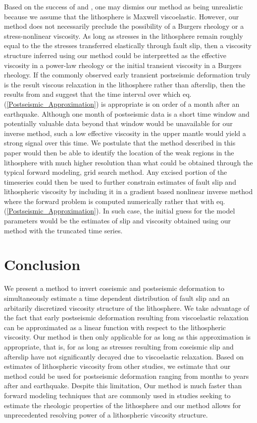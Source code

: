 \documentclass[extra]{gji}
\begin{document}
Based on the success of \citet{P2003,P2005} and \citet{F2006b}, one
may dismiss our method as being unrealistic because we assume that the
lithosphere is Maxwell viscoelastic.  However, our method does not
necessarily preclude the possibility of a Burgers rheology or a
stress-nonlinear viscosity.  As long as stresses in the lithosphere
remain roughly equal to the the stresses transferred elastically
through fault slip, then a viscosity structure inferred using our
method could be interpretted as the effective viscosity in a power-law
rheology or the initial transient viscosity in a Burgers rheology.  If
the commonly observed early transient postseismic deformation truly is
the result viscous relaxation in the lithosphere rather than afterslip,
then the results from \citet{P2003,P2005} and \citet{F2006b} suggest
that the time interval over which
eq. (\ref{Postseismic_Approximation}) is appropriate is on order of a
month after an earthquake.  Although one month of postseismic data is
a short time window and potentially valuable data beyond that window
would be unavailable for our inverse method, such a low
effective viscosity in the upper mantle would yield a strong signal
over this time.  We postulate that the method described in this paper
would then be able to identify the location of the weak regions in the
lithosphere with much higher resolution than what could be obtained
through the typical forward modeling, grid search method.  Any excised
portion of the timeseries could then be used to further constrain
estimates of fault slip and lithospheric viscosity by including it in
a gradient based nonlinear inverse method where the forward problem is
computed numerically rather that with
eq. (\ref{Postseismic_Approximation}). In such case, the initial guess
for the model parameters would be the estimates of slip and viscosity
obtained using our method with the truncated time series.  

\section{Conclusion}
We present a method to invert coseismic and postseismic deformation to
simultaneously estimate a time dependent distribution of fault slip
and an arbitarily discretized viscosity structure of the lithosphere.
We take advantage of the fact that early postseismic deformation
resulting from viscoelastic relaxation can be approximated as a linear
function with respect to the lithospheric viscosity.  Our method is
then only applicable for as long as this approximation is appropriate,
that is, for as long as stresses resulting from coseismic slip and
afterslip have not significantly decayed due to viscoelastic
relaxation.  Based on estimates of lithospheric viscosity from other
studies, we estimate that our method could be used for postseismic
deformation ranging from months to years after and earthquake.
Despite this limitation, Our method is much faster than forward
modeling techniques that are commonly used in studies seeking to
estimate the rheologic properties of the lithosphere and our method
allows for unprecedented resolving power of a lithospheric viscosity
structure.
\end{document}

